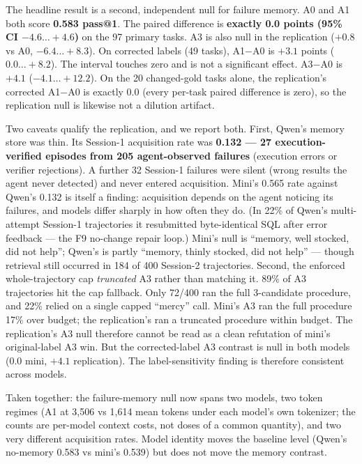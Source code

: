 \documentclass[sigconf, nonacm]{acmart}
\begin{document}
The headline result is a second, independent null for failure memory. A0 and A1 both score \textbf{0.583 pass@1}. The paired difference is \textbf{exactly 0.0 points (95\% CI $-4.6\ldots+4.6$)} on the 97 primary tasks. A3 is also null in the replication ($+0.8$ vs A0, $-6.4\ldots+8.3$). On corrected labels (49 tasks), A1$-$A0 is $+3.1$ points ($0.0\ldots+8.2$). The interval touches zero and is not a significant effect. A3$-$A0 is $+4.1$ ($-4.1\ldots+12.2$). On the 20 changed-gold tasks alone, the replication's corrected A1$-$A0 is exactly 0.0 (every per-task paired difference is zero), so the replication null is likewise not a dilution artifact.

Two caveats qualify the replication, and we report both. First, Qwen's memory store was thin. Its Session-1 acquisition rate was \textbf{0.132 --- 27 execution-verified episodes from 205 agent-observed failures} (execution errors or verifier rejections). A further 32 Session-1 failures were silent (wrong results the agent never detected) and never entered acquisition. Mini's 0.565 rate against Qwen's 0.132 is itself a finding: acquisition depends on the agent noticing its failures, and models differ sharply in how often they do. (In 22\% of Qwen's multi-attempt Session-1 trajectories it resubmitted byte-identical SQL after error feedback --- the F9 no-change repair loop.) Mini's null is ``memory, well stocked, did not help''; Qwen's is partly ``memory, thinly stocked, did not help'' --- though retrieval still occurred in 184 of 400 Session-2 trajectories. Second, the enforced whole-trajectory cap \emph{truncated} A3 rather than matching it. 89\% of A3 trajectories hit the cap fallback. Only 72/400 ran the full 3-candidate procedure, and 22\% relied on a single capped ``mercy'' call. Mini's A3 ran the full procedure 17\% over budget; the replication's ran a truncated procedure within budget. The replication's A3 null therefore cannot be read as a clean refutation of mini's original-label A3 win. But the corrected-label A3 contrast is null in both models (0.0 mini, $+4.1$ replication). The label-sensitivity finding is therefore consistent across models.

Taken together: the failure-memory null now spans two models, two token regimes (A1 at 3,506 vs 1,614 mean tokens under each model's own tokenizer; the counts are per-model context costs, not doses of a common quantity), and two very different acquisition rates. Model identity moves the baseline level (Qwen's no-memory 0.583 vs mini's 0.539) but does not move the memory contrast.
\end{document}
